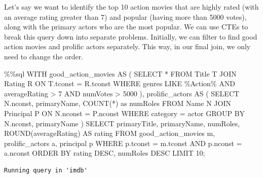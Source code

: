 \documentclass[
  letterpaper,
  DIV=11,
  numbers=noendperiod]{scrreprt}
\newenvironment{Shaded}{\begin{snugshade}}{\end{snugshade}}
\newcommand{\DecValTok}[1]{\textcolor[rgb]{0.68,0.00,0.00}{#1}}
\newcommand{\ImportTok}[1]{\textcolor[rgb]{0.00,0.46,0.62}{#1}}
\newcommand{\NormalTok}[1]{\textcolor[rgb]{0.00,0.23,0.31}{#1}}
\newcommand{\OperatorTok}[1]{\textcolor[rgb]{0.37,0.37,0.37}{#1}}
\newcommand{\StringTok}[1]{\textcolor[rgb]{0.13,0.47,0.30}{#1}}
\begin{document}
Let's say we want to identify the top 10 action movies that are highly
rated (with an average rating greater than 7) and popular (having more
than 5000 votes), along with the primary actors who are the most
popular. We can use CTEs to break this query down into separate
problems. Initially, we can filter to find good action movies and
prolific actors separately. This way, in our final join, we only need to
change the order.

\begin{Shaded}
\begin{Highlighting}[]
\OperatorTok{\%\%}\NormalTok{sql}
\NormalTok{WITH }
\NormalTok{good\_action\_movies AS (}
\NormalTok{    SELECT }\OperatorTok{*}
\NormalTok{    FROM Title T JOIN Rating R ON T.tconst }\OperatorTok{=}\NormalTok{ R.tconst  }
\NormalTok{    WHERE genres LIKE }\StringTok{\textquotesingle{}\%Action\%\textquotesingle{}}\NormalTok{ AND averageRating }\OperatorTok{\textgreater{}} \DecValTok{7}\NormalTok{ AND numVotes }\OperatorTok{\textgreater{}} \DecValTok{5000}
\NormalTok{),}
\NormalTok{prolific\_actors AS (}
\NormalTok{    SELECT N.nconst, primaryName, COUNT(}\OperatorTok{*}\NormalTok{) }\ImportTok{as}\NormalTok{ numRoles}
\NormalTok{    FROM Name N JOIN Principal P ON N.nconst }\OperatorTok{=}\NormalTok{ P.nconst}
\NormalTok{    WHERE category }\OperatorTok{=} \StringTok{\textquotesingle{}actor\textquotesingle{}}
\NormalTok{    GROUP BY N.nconst, primaryName}
\NormalTok{)}
\NormalTok{SELECT primaryTitle, primaryName, numRoles, ROUND(averageRating) AS rating}
\NormalTok{FROM good\_action\_movies m, prolific\_actors a, principal p}
\NormalTok{WHERE p.tconst }\OperatorTok{=}\NormalTok{ m.tconst AND p.nconst }\OperatorTok{=}\NormalTok{ a.nconst}
\NormalTok{ORDER BY rating DESC, numRoles DESC}
\NormalTok{LIMIT }\DecValTok{10}\OperatorTok{;}
\end{Highlighting}
\end{Shaded}

\begin{verbatim}
Running query in 'imdb'
\end{verbatim}
\end{document}
